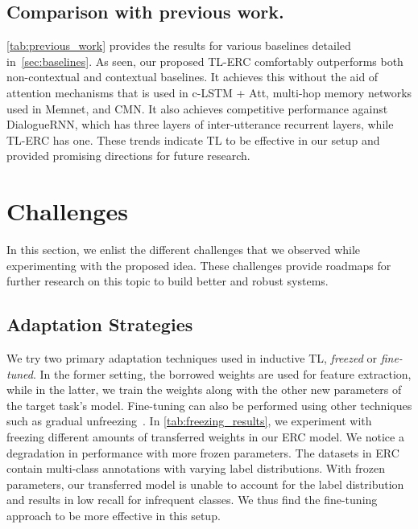 \documentclass[preprint,3pt]{elsarticle}
\begin{document}
\subsection{Comparison with previous work.} \label{sec:baseline_results}

\cref{tab:previous_work} provides the results for various baselines detailed in~\cref{sec:baselines}. As seen, our proposed TL-ERC comfortably outperforms both non-contextual and contextual baselines. It achieves this without the aid of attention mechanisms that is used in c-LSTM + Att, multi-hop memory networks used in Memnet, and CMN. It also achieves competitive performance against DialogueRNN, which has three layers of inter-utterance recurrent layers, while TL-ERC has one. These trends indicate TL to be effective in our setup and provided promising directions for future research.


\section{Challenges} \label{sec:challenges}

In this section, we enlist the different challenges that we observed while experimenting with the proposed idea. These challenges provide roadmaps for further research on this topic to build better and robust systems.



\subsection{Adaptation Strategies}

We try two primary adaptation techniques used in inductive TL, \textit{freezed} or \textit{fine-tuned}. In the former setting, the borrowed weights are used for feature extraction, while in the latter,  we train the weights along with the other new parameters of the target task's model. Fine-tuning can also be performed using other techniques such as gradual unfreezing~\cite{peters2019tune}. In \cref{tab:freezing_results}, we experiment with freezing different amounts of transferred weights in our ERC model. We notice a degradation in performance with more frozen parameters. The datasets in ERC contain multi-class annotations with varying label distributions. With frozen parameters, our transferred model is unable to account for the label distribution and results in low recall for infrequent classes. We thus find the fine-tuning approach to be more effective in this setup.
\end{document}
